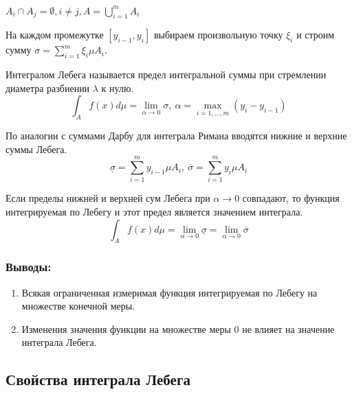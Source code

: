 \documentclass[14pt,a4paper]{extarticle}
\theoremstyle{definition}
\theoremstyle{remark}
\newcommand{\be}{\begin{enumerate}}
\newcommand{\ee}{\end{enumerate}}
\newcommand{\sep}{ , \ \allowbreak }
\renewcommand{\[}{\begin{dmath*}[compact]}
\renewcommand{\]}{\end{dmath*}}
\begin{document}
$A_i \cap A_j = \emptyset, i \neq j, A=\bigcup_{i=1}^m A_i$

На каждом промежутке $[y_{i-1}, y_i]$ выбираем произвольную точку $\xi_i$ и строим сумму $\sigma = \sum _{i=1}^m \xi_i \mu A_i$.

Интегралом Лебега называется предел интегральной суммы при стремлении диаметра разбиении $\lambda$ к нулю.
\[\int_A f(x) d\mu=\lim_{\alpha \to 0} \sigma \sep \alpha=\max_{i=1,\dots,m}(y_i-y_{i-1})\]

По аналогии с суммами Дарбу для интеграла Римана вводятся нижние и верхние суммы Лебега.
\[\underline{\sigma} = \sum _{i=1}^m y_{i-1}\mu A_i \sep \overline{\sigma} = \sum _{i=1}^m y_{i}\mu A_i\]

Если пределы нижней и верхней сум Лебега при $\alpha \to 0$ совпадают, то функция интегрируемая по Лебегу и этот предел является значением интеграла.
\[\int_A f(x) d\mu=\lim_{\alpha \to 0} \underline{\sigma} = \lim_{\alpha \to 0} \overline{\sigma}\]

\subsubsection{Выводы:}
\be
  \item Всякая ограниченная измеримая функция интегрируемая по Лебегу на множестве конечной меры.
  \item Изменения значения функции на множестве меры 0 не влияет на значение интеграла Лебега.
\ee

\subsection{Свойства интеграла Лебега}
\end{document}
